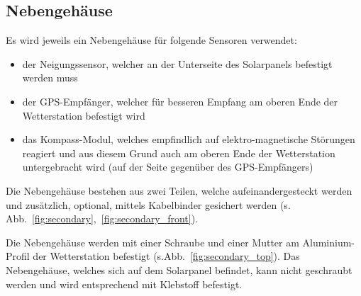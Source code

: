 \subsection{Nebengehäuse}\label{sec:ge_neben}
Es wird jeweils ein Nebengehäuse für folgende Sensoren verwendet:
\begin{itemize}
\item der Neigungssensor, welcher an der Unterseite des Solarpanels befestigt werden muss
\item der GPS-Empfänger, welcher für besseren Empfang am oberen Ende der Wetterstation befestigt wird
\item das Kompass-Modul, welches empfindlich auf elektro-magnetische Störungen reagiert und aus diesem Grund auch am oberen Ende der Wetterstation untergebracht wird (auf der Seite gegenüber des GPS-Empfängers)
\end{itemize}
Die Nebengehäuse bestehen aus zwei Teilen, welche aufeinandergesteckt werden und zusätzlich, optional, mittels Kabelbinder gesichert werden (s. Abb.~\ref{fig:secondary},~\ref{fig:secondary_front}).

Die Nebengehäuse werden mit einer Schraube und einer Mutter am Aluminium-Profil der Wetterstation befestigt (s.Abb.~\ref{fig:secondary_top}). Das Nebengehäuse, welches sich auf dem Solarpanel befindet, kann nicht geschraubt werden und wird entsprechend mit Klebstoff befestigt.

